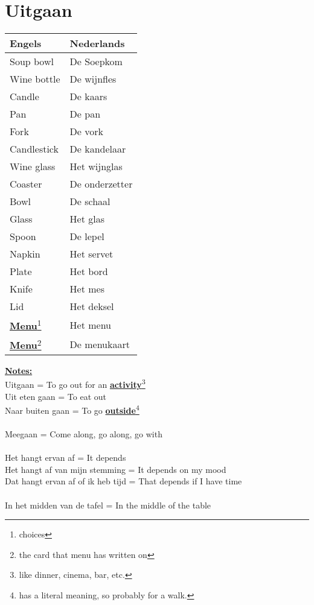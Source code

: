 \documentclass[a4paper,14pt]{extarticle}
\newcommand{\note}[2]{\underline{\textbf{#1}}\footnote{#2}}
\newcommand{\emp}[1]{\underline{\textbf{#1}}}
\begin{document}
\section{Uitgaan}
\begin{paracol}{2}
\begin{tabularx}{200pt}{p{100pt} p{100pt}}
    \hline
    \textbf{Engels} & \textbf{Nederlands} \\
    \hline
    Soup bowl & De Soepkom \\
    Wine bottle & De wijnfles \\
    Candle & De kaars \\
    Pan  & De pan \\
    Fork & De vork \\
    Candlestick & De kandelaar \\
    Wine glass & Het wijnglas \\
    Coaster & De onderzetter \\
    Bowl & De schaal \\
    Glass & Het glas \\
    Spoon & De lepel \\
    Napkin & Het servet \\
    Plate & Het bord \\
    Knife & Het mes \\
    Lid & Het deksel \\
    \note{Menu}{choices} & Het menu \\
    \note{Menu}{the card that menu has written on} & De menukaart \\
\end{tabularx}
\switchcolumn
\emp{Notes:} \\
Uitgaan = To go out for an \note{activity}{like dinner, cinema, bar, etc.} \\
Uit eten gaan = To eat out \\
Naar buiten gaan = To go \note{outside}{has a literal meaning, so probably for a walk.} \\ \\
Meegaan = Come along, go along, go with \\ \\
Het hangt ervan af = It depends \\ 
Het hangt af van mijn stemming = It depends on my mood \\
Dat hangt ervan af of ik heb tijd = That depends if I have time \\ \\
In het midden van de tafel = In the middle of the table \\
\end{paracol}
\end{document}
